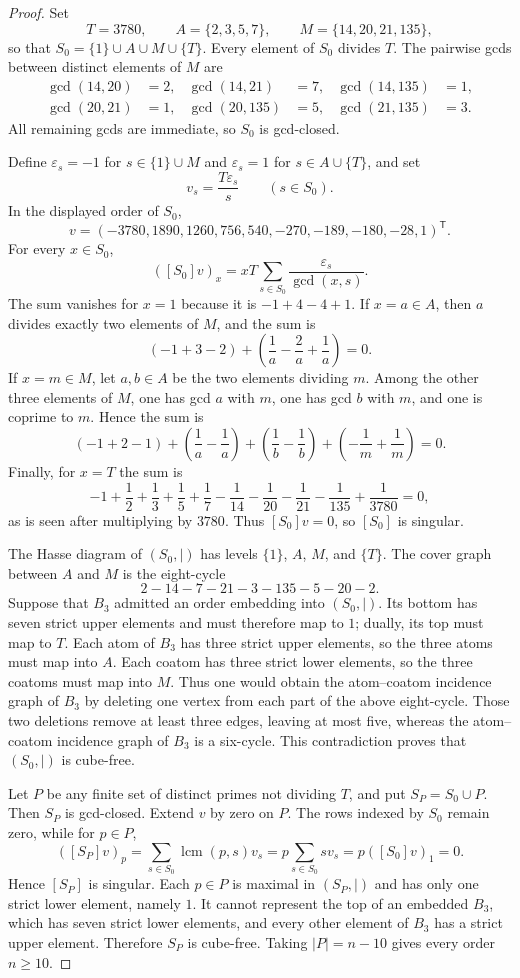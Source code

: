 \documentclass[11pt]{amsart}
\begin{document}
\begin{proof}
Set
\[
 T=3780,\qquad A=\{2,3,5,7\},\qquad M=\{14,20,21,135\},
\]
so that $S_0=\{1\}\cup A\cup M\cup\{T\}$. Every element of $S_0$ divides
$T$. The pairwise gcds between distinct elements of $M$ are
\[
\begin{aligned}
 \gcd(14,20)&=2, & \gcd(14,21)&=7, & \gcd(14,135)&=1,\\
 \gcd(20,21)&=1, & \gcd(20,135)&=5, & \gcd(21,135)&=3.
\end{aligned}
\]
All remaining gcds are immediate, so $S_0$ is gcd-closed.

Define $\varepsilon_s=-1$ for $s\in\{1\}\cup M$ and
$\varepsilon_s=1$ for $s\in A\cup\{T\}$, and set
\[
 v_s=\frac{T\varepsilon_s}{s}\qquad(s\in S_0).
\]
In the displayed order of $S_0$,
\[
 v=(-3780,1890,1260,756,540,-270,-189,-180,-28,1)^{\mathsf T}.
\]
For every $x\in S_0$,
\[
 ([S_0]v)_x
 =xT\sum_{s\in S_0}\frac{\varepsilon_s}{\gcd(x,s)}.
\]
The sum vanishes for $x=1$ because it is $-1+4-4+1$. If $x=a\in A$,
then $a$ divides exactly two elements of $M$, and the sum is
\[
 (-1+3-2)+\left(\frac1a-\frac2a+\frac1a\right)=0.
\]
If $x=m\in M$, let $a,b\in A$ be the two elements dividing $m$. Among the
other three elements of $M$, one has gcd $a$ with $m$, one has gcd $b$ with
$m$, and one is coprime to $m$. Hence the sum is
\[
 (-1+2-1)
 +\left(\frac1a-\frac1a\right)
 +\left(\frac1b-\frac1b\right)
 +\left(-\frac1m+\frac1m\right)=0.
\]
Finally, for $x=T$ the sum is
\[
 -1+\frac12+\frac13+\frac15+\frac17
 -\frac1{14}-\frac1{20}-\frac1{21}-\frac1{135}
 +\frac1{3780}=0,
\]
as is seen after multiplying by $3780$. Thus $[S_0]v=0$, so $[S_0]$ is
singular.

The Hasse diagram of $(S_0,\mid)$ has levels $\{1\}$, $A$, $M$, and
$\{T\}$. The cover graph between $A$ and $M$ is the eight-cycle
\[
 2-14-7-21-3-135-5-20-2.
\]
Suppose that $B_3$ admitted an order embedding into $(S_0,\mid)$. Its bottom
has seven strict upper elements and must therefore map to $1$; dually, its top
must map to $T$. Each atom of $B_3$ has three strict upper elements, so the
three atoms must map into $A$. Each coatom has three strict lower elements, so
the three coatoms must map into $M$. Thus one would obtain the atom--coatom
incidence graph of $B_3$ by deleting one vertex from each part of the above
eight-cycle. Those two deletions remove at least three edges, leaving at most
five, whereas the atom--coatom incidence graph of $B_3$ is a six-cycle. This
contradiction proves that $(S_0,\mid)$ is cube-free.

Let $P$ be any finite set of distinct primes not dividing $T$, and put
$S_P=S_0\cup P$. Then $S_P$ is gcd-closed. Extend $v$ by zero on $P$. The
rows indexed by $S_0$ remain zero, while for $p\in P$,
\[
 ([S_P]v)_p
 =\sum_{s\in S_0}\operatorname{lcm}(p,s)v_s
 =p\sum_{s\in S_0}s v_s
 =p([S_0]v)_1=0.
\]
Hence $[S_P]$ is singular. Each $p\in P$ is maximal in $(S_P,\mid)$ and has
only one strict lower element, namely $1$. It cannot represent the top of an
embedded $B_3$, which has seven strict lower elements, and every other element
of $B_3$ has a strict upper element. Therefore $S_P$ is cube-free. Taking
$|P|=n-10$ gives every order $n\geq10$.


\end{proof}
\end{document}
